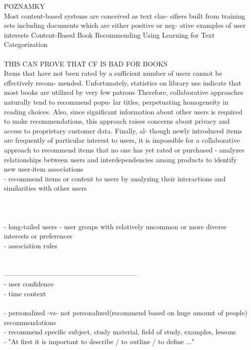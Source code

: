 \documentclass[10pt,oneside,english,a4paper]{article}
\begin{document}
\clearpage{}
POZNAMKY\\
Most content-based systems are conceived as text clas-
sifiers built from training sets including documents which are either positive or neg-
ative examples of user interests
%
%
%
Content-Based Book Recommending Using Learning for Text Categorization\\\\
THIS CAN PROVE THAT CF IS BAD FOR BOOKS \cite{Mooney2000195}\\
Items that have not been rated
by a sufficient number of users cannot be effectively recom-
mended. Unfortunately, statistics on library use indicate that
most books are utilized by very few patrons Therefore,
collaborative approaches naturally tend to recommend popu-
lar titles, perpetuating homogeneity in reading choices. Also,
since significant information about other users is required to
make recommendations, this approach raises concerns about
privacy and access to proprietary customer data. Finally, al-
though newly introduced items are frequently of particular
interest to users, it is impossible for a collaborative approach
to recommend items that no one has yet rated or purchased
%
%
- analyzes relationships between users  and interdependencies among products to identify new user-item associations\\
- recommend items or content to users by analyzing their interactions and similarities with other users\\\\
\cite{5197422}\\\\
%
- long-tailed users - user groups with relatively uncommon or more diverse interests or preferences\\
- association rules\\
\cite{Yan2024}\\\\
%
%
-----------------------------------------------------------\\
- user confidence\\
- time context\\\\
- personalized -vs- not personalized(recommend based on huge amount of people) recommendations\\
- recommend specific subject, study material, field of study, examples, lessons\\
- "At first it is important to describe / to outline / to define ..."\\
\end{document}
